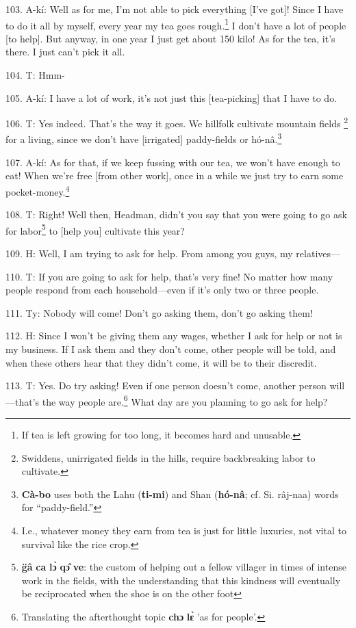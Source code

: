 103. A-kí: Well as for me, I'm not able to pick everything [I've got]! Since
I have to do it all by myself, every year my tea goes rough.\footnote{If tea is left growing for too long, it becomes hard and unusable.} I don't have
a lot of people [to help]. But anyway, in one year I just get about 150 kilo!
As for the tea, it's there. I just can't pick it all.

104. T: Hmm-

105. A-kí: I have a lot of work, it's not just this [tea-picking] that I have
to do.

106. T: Yes indeed. That's the way it goes. We hillfolk cultivate mountain fields
\footnote{Swiddens, unirrigated fields in the hills, require backbreaking labor to cultivate.} for a living, since we don't have [irrigated] paddy-fields or hó-nâ.\footnote{\textbf{Cà-bo} uses both the Lahu (\textbf{ti-mi}) and Shan (\textbf{hó-nâ}; cf. Si. râj-naa) words for ``paddy-field.''}

107. A-kí: As for that, if we keep fussing with our tea, we won't have enough
to eat! When we're free [from other work], once in a while we just try to earn
some pocket-money.\footnote{I.e., whatever money they earn from tea is just for little luxuries, not vital to survival like the rice crop.}

108. T: Right! Well then, Headman, didn't you say that you were going to go ask
for labor\footnote{\textbf{g̈â} \textbf{ca} \textbf{lɔ̀} \textbf{qɔ̂} \textbf{ve}: the custom of helping out a fellow villager in times of intense work in the fields, with the understanding that this kindness will eventually be reciprocated when the shoe is on the other foot} to [help you] cultivate this year?

109. H: Well, I am trying to ask for help. From among you guys, my relatives---

110. T: If you are going to ask for help, that's very fine! No matter how many
people respond from each household---even if it's only two or three people.

111. Ty: Nobody will come! Don't go asking them, don't go asking them!

112. H: Since I won't be giving them any wages, whether I ask for help or
not is my business. If I ask them and they don't come, other people will be told,
and when these others hear that they didn't come, it will be to their discredit.

113. T: Yes. Do try asking! Even if one person doesn't come, another person will---that's
the way people are.\footnote{Translating the afterthought topic \textbf{chɔ} \textbf{lɛ̀} 'as for people'.} What day are you planning to go ask for help?


